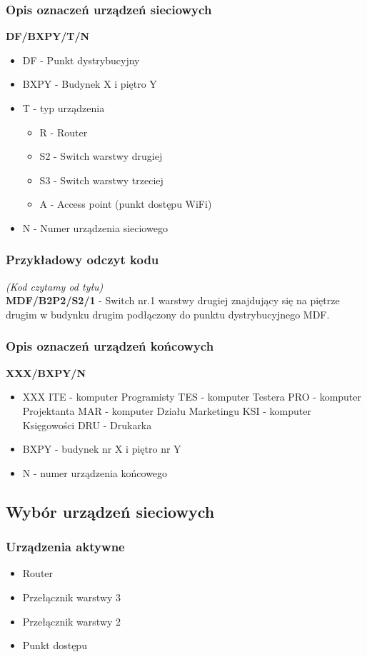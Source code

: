 \documentclass[a4paper,12pt]{extarticle}  %
\begin{document}
\subsubsection{Opis oznaczeń urządzeń sieciowych}
\textbf{DF/BXPY/T/N}
\begin{itemize}
	\item DF - Punkt dystrybucyjny
	\item BXPY - Budynek X i piętro Y
	\item T - typ urządzenia
	\begin{itemize}
		\item R - Router
		\item S2 - Switch warstwy drugiej
		\item S3 - Switch warstwy trzeciej
		\item A - Access point (punkt dostępu WiFi)
	\end{itemize}
	\item N - Numer urządzenia sieciowego
\end{itemize}
\subsubsection{Przykładowy odczyt kodu}
\emph{(Kod czytamy od tyłu)}\\
\textbf{MDF/B2P2/S2/1} - Switch nr.1 warstwy drugiej znajdujący się na piętrze drugim w budynku drugim podłączony do punktu dystrybucyjnego MDF.
\subsubsection{Opis oznaczeń urządzeń końcowych}
\textbf{XXX/BXPY/N}
\begin{itemize}
    \item XXX
        \subitem ITE - komputer Programisty
        \subitem TES - komputer Testera
        \subitem PRO - komputer Projektanta
        \subitem MAR - komputer Działu Marketingu
        \subitem KSI - komputer Księgowości
        \subitem DRU - Drukarka
    \item BXPY - budynek nr X i piętro nr Y
    \item N - numer urządzenia końcowego
\end{itemize}

\subsection{Wybór urządzeń sieciowych}
\subsubsection{Urządzenia aktywne}
\begin{itemize}
	\item Router
	\item Przełącznik warstwy 3
	\item Przełącznik warstwy 2
	\item Punkt dostępu
\end{itemize}
\end{document}
